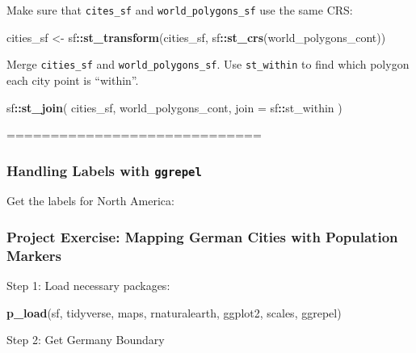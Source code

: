 \documentclass[
]{article}
\newenvironment{Shaded}{\begin{snugshade}}{\end{snugshade}}
\newcommand{\AttributeTok}[1]{\textcolor[rgb]{0.13,0.29,0.53}{#1}}
\newcommand{\FunctionTok}[1]{\textcolor[rgb]{0.13,0.29,0.53}{\textbf{#1}}}
\newcommand{\NormalTok}[1]{#1}
\newcommand{\OtherTok}[1]{\textcolor[rgb]{0.56,0.35,0.01}{#1}}
\newcommand{\SpecialCharTok}[1]{\textcolor[rgb]{0.81,0.36,0.00}{\textbf{#1}}}
\begin{document}
Make sure that \texttt{cites\_sf} and \texttt{world\_polygons\_sf} use
the same CRS:

\begin{Shaded}
\begin{Highlighting}[]
\NormalTok{cities\_sf }\OtherTok{\textless{}{-}}\NormalTok{ sf}\SpecialCharTok{::}\FunctionTok{st\_transform}\NormalTok{(cities\_sf, sf}\SpecialCharTok{::}\FunctionTok{st\_crs}\NormalTok{(world\_polygons\_cont))}
\end{Highlighting}
\end{Shaded}

Merge \texttt{cities\_sf} and \texttt{world\_polygons\_sf}. Use
\texttt{st\_within} to find which polygon each city point is ``within''.

\begin{Shaded}
\begin{Highlighting}[]
\NormalTok{sf}\SpecialCharTok{::}\FunctionTok{st\_join}\NormalTok{(}
\NormalTok{  cities\_sf, world\_polygons\_cont,}
  \AttributeTok{join =}\NormalTok{ sf}\SpecialCharTok{::}\NormalTok{st\_within}
\NormalTok{)}
\end{Highlighting}
\end{Shaded}

=============================

\subsubsection{\texorpdfstring{Handling Labels with
\texttt{ggrepel}}{Handling Labels with ggrepel}}\label{handling-labels-with-ggrepel}

Get the labels for North America:

\subsubsection{Project Exercise: Mapping German Cities with Population
Markers}\label{project-exercise-mapping-german-cities-with-population-markers}

Step 1: Load necessary packages:

\begin{Shaded}
\begin{Highlighting}[]
\FunctionTok{p\_load}\NormalTok{(sf, tidyverse, maps, rnaturalearth, ggplot2, scales, ggrepel)}
\end{Highlighting}
\end{Shaded}

Step 2: Get Germany Boundary
\end{document}
